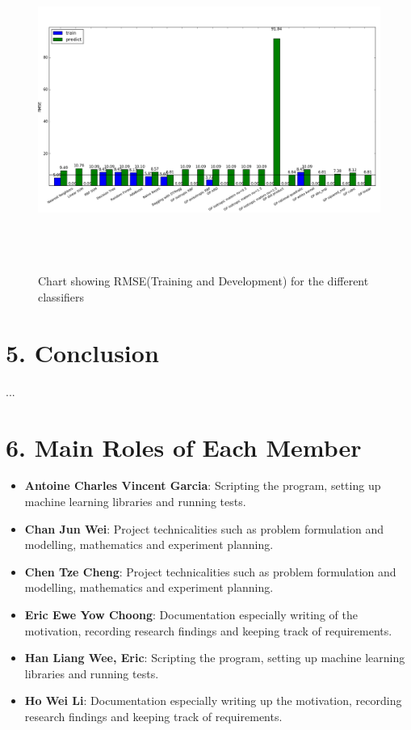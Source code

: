 \documentclass{article}
\begin{document}
	\begin{figure}
	\includegraphics[height=105mm, keepaspectratio]{results}
	\caption{Chart showing RMSE(Training and Development) for the different classifiers}
	\label{rmse_results_chart}
	\end{figure}

	\newpage
	\section{5. Conclusion}	
	... \\

	\section{6. Main Roles of Each Member}
	\begin{itemize}
		\item \textbf{Antoine Charles Vincent Garcia}: 
		Scripting the program, setting up machine learning libraries and running tests.
		\item \textbf{Chan Jun Wei}: 
		Project technicalities such as problem formulation and modelling, mathematics and experiment planning.
		\item \textbf{Chen Tze Cheng}: 
		Project technicalities such as problem formulation and modelling, mathematics and experiment planning.
		\item \textbf{Eric Ewe Yow Choong}: 
		Documentation especially writing of the motivation, recording research findings and keeping track of requirements.
		\item \textbf{Han Liang Wee, Eric}: 
		Scripting the program, setting up machine learning libraries and running tests.
		\item \textbf{Ho Wei Li}: 
		Documentation especially writing up the motivation, recording research findings and keeping track of requirements.
	\end{itemize}
	
	
	
\end{document}
